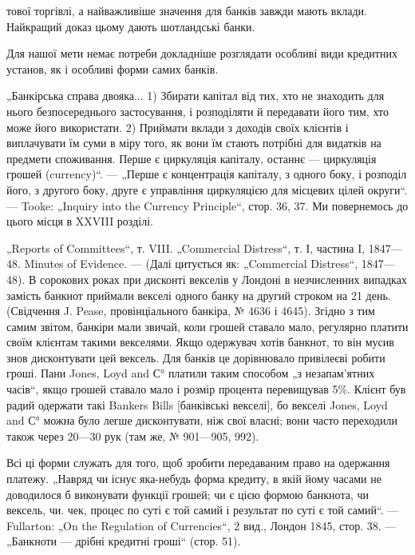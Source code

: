 тової торгівлі, а найважливіше значення для банків завжди мають вклади. Найкращий доказ цьому дають
шотландські банки.

Для нашої мети немає потреби докладніше розглядати особливі види кредитних установ, як і особливі
форми самих банків.

„Банкірська справа двояка... 1) Збирати капітал від тих, хто не знаходить
для нього безпосереднього застосування, і розподіляти й передавати його
тим, хто може його використати. 2) Приймати вклади з доходів своїх клієнтів
і виплачувати їм суми в міру того, як вони їм стають потрібні для видатків
на предмети споживання. Перше є циркуляція капіталу, останнє — циркуляція
грошей (currency)“. — „Перше є концентрація капіталу, з одного боку, і розподіл його, з другого
боку, друге є управління циркуляцією для місцевих
цілей округи“. — Tooke: „Inquiry into the Currency Principle“, стор. 36, 37. Ми
повернемось до цього місця в XXVIII розділі.

„Reports of Committees“, т. VIII. „Commercial Distress“, т. І, частина I, 1847—48.
Minutes of Evidence. — (Далі цитується як: „Commercial Distress“, 1847—48). В сорокових роках при
дисконті векселів у Лондоні в незчисленних випадках замість банкнот приймали векселі одного банку на
другий строком на 21 день.
(Свідчення J. Pease, провінціального банкіра, № 4636 і 4645). Згідно з тим самим звітом, банкіри
мали звичай, коли грошей ставало мало, регулярно платити
своїм клієнтам такими векселями. Якщо одержувач хотів банкнот, то він мусив
знов дисконтувати цей вексель. Для банків це дорівнювало привілеєві робити
гроші. Пани Jones, Loyd and С° платили таким способом „з незапам’ятних часів“,
якщо грошей ставало мало і розмір процента перевищував 5\%. Клієнт був
радий одержати такі Bankers Bills [банківські векселі], бо векселі Jones, Loyd
and С° можна було легше дисконтувати, ніж свої власні; вони часто переходили також через 20—30 рук
(там же, № 901—905, 992).

Всі ці форми служать для того, щоб зробити передаваним право на одержання платежу. „Навряд чи існує
яка-небудь форма кредиту, в якій йому часами
не доводилося б виконувати функції грошей; чи є цією формою банкнота, чи
вексель, чи. чек, процес по суті є той самий і результат по суті є той самий“. — Fullarton: „On the
Regulation of Currencies“, 2 вид., Лондон 1845, стор. 38. — „Банкноти — дрібні кредитні гроші“
(стор. 51).

